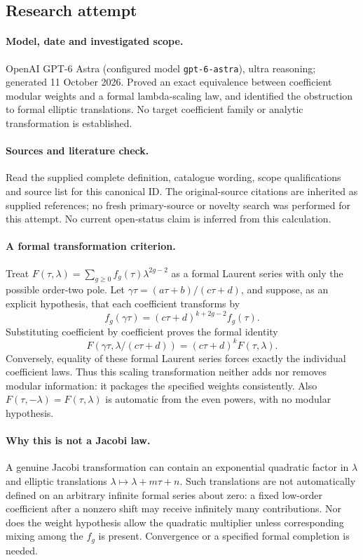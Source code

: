 \documentclass[11pt]{article}
\begin{document}
\subsection{Research attempt}
\paragraph{Model, date and investigated scope.}
OpenAI GPT-6 Astra (configured model \texttt{gpt-6-astra}), ultra reasoning; generated 11 October 2026. Proved an exact equivalence between coefficient modular weights and a formal lambda-scaling law, and identified the obstruction to formal elliptic translations. No target coefficient family or analytic transformation is established.

\paragraph{Sources and literature check.}
Read the supplied complete definition, catalogue wording, scope qualifications and source list for this canonical ID. The original-source citations are inherited as supplied references; no fresh primary-source or novelty search was performed for this attempt. No current open-status claim is inferred from this calculation.

\paragraph{A formal transformation criterion.}Treat \(F(\tau,\lambda)=\sum_{g\ge0}f_g(\tau)\lambda^{2g-2}\) as a formal Laurent series with only the possible order-two pole. Let \(\gamma\tau=(a\tau+b)/(c\tau+d)\), and suppose, as an explicit hypothesis, that each coefficient transforms by
\[f_g(\gamma\tau)=(c\tau+d)^{k+2g-2}f_g(\tau).
\]
Substituting coefficient by coefficient proves the formal identity
\[F(\gamma\tau,\lambda/(c\tau+d))=(c\tau+d)^kF(\tau,\lambda).
\]
Conversely, equality of these formal Laurent series forces exactly the individual coefficient laws. Thus this scaling transformation neither adds nor removes modular information: it packages the specified weights consistently. Also \(F(\tau,-\lambda)=F(\tau,\lambda)\) is automatic from the even powers, with no modular hypothesis.
\paragraph{Why this is not a Jacobi law.}A genuine Jacobi transformation can contain an exponential quadratic factor in \(\lambda\) and elliptic translations \(\lambda\mapsto\lambda+m\tau+n\). Such translations are not automatically defined on an arbitrary infinite formal series about zero: a fixed low-order coefficient after a nonzero shift may receive infinitely many contributions. Nor does the weight hypothesis allow the quadratic multiplier unless corresponding mixing among the \(f_g\) is present. Convergence or a specified formal completion is needed.
\end{document}
